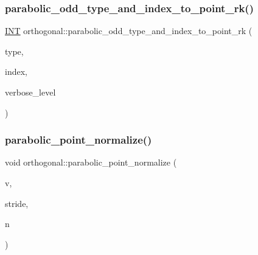 \mbox{\label{classorthogonal_aac70113614b52601e38b3ce8cbffbc9a}} 
\subsubsection{\texorpdfstring{parabolic\+\_\+odd\+\_\+type\+\_\+and\+\_\+index\+\_\+to\+\_\+point\+\_\+rk()}{parabolic\_odd\_type\_and\_index\_to\_point\_rk()}}
{\footnotesize\ttfamily \mbox{\hyperlink{galois_8h_a09fddde158a3a20bd2dcadb609de11dc}{I\+NT}} orthogonal\+::parabolic\+\_\+odd\+\_\+type\+\_\+and\+\_\+index\+\_\+to\+\_\+point\+\_\+rk (\begin{DoxyParamCaption}\item[{\mbox{\hyperlink{galois_8h_a09fddde158a3a20bd2dcadb609de11dc}{I\+NT}}}]{type,  }\item[{\mbox{\hyperlink{galois_8h_a09fddde158a3a20bd2dcadb609de11dc}{I\+NT}}}]{index,  }\item[{\mbox{\hyperlink{galois_8h_a09fddde158a3a20bd2dcadb609de11dc}{I\+NT}}}]{verbose\+\_\+level }\end{DoxyParamCaption})}

\mbox{\label{classorthogonal_a2a705e8d2729a3fa15663084d2bb8ab8}} 
\subsubsection{\texorpdfstring{parabolic\+\_\+point\+\_\+normalize()}{parabolic\_point\_normalize()}}
{\footnotesize\ttfamily void orthogonal\+::parabolic\+\_\+point\+\_\+normalize (\begin{DoxyParamCaption}\item[{\mbox{\hyperlink{galois_8h_a09fddde158a3a20bd2dcadb609de11dc}{I\+NT}} $\ast$}]{v,  }\item[{\mbox{\hyperlink{galois_8h_a09fddde158a3a20bd2dcadb609de11dc}{I\+NT}}}]{stride,  }\item[{\mbox{\hyperlink{galois_8h_a09fddde158a3a20bd2dcadb609de11dc}{I\+NT}}}]{n }\end{DoxyParamCaption})}

